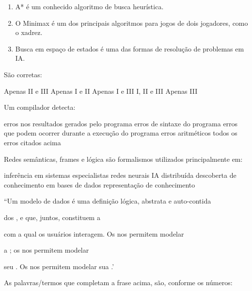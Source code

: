 \documentclass[12pt, addpoints]{exam}
\begin{document}
\begin{questions}
\begin{enumerate}[label=\Roman*.]
    \item A* é um conhecido algoritmo de busca heurística.

    \item O Minimax é um dos principais algoritmos para jogos de dois jogadores, como o xadrez.

    \item Busca em espaço de estados é uma das formas de resolução de problemas em IA.

\end{enumerate}

São corretas:
\begin{choices}
\choice Apenas II e III
\choice Apenas I e II
\choice Apenas I e III
\choice I, II e III
\choice Apenas III
\end{choices}

\question

Um compilador detecta:
\begin{choices}
\choice erros nos resultados gerados pelo programa
\choice erros de sintaxe do programa 
\choice erros que podem ocorrer durante a execução do programa
\choice erros aritméticos
\choice todos os erros citados acima
\end{choices}

\question

Redes semânticas, frames e lógica são formalismos utilizados principalmente em: 
\begin{choices}
\choice inferência em sistemas especialistas
\choice redes neurais
\choice IA distribuída
\choice descoberta de conhecimento em bases de dados
\choice representação de conhecimento
\end{choices}

\question

``Um modelo de dados é uma definição lógica, abstrata e auto-contida

dos ,  e  que, juntos, constituem a 

com a qual os usuários interagem. Os  nos permitem modelar

a ; os  nos permitem modelar

seu . Os  nos permitem modelar sua .'



As palavras/termos que completam a frase acima, são, conforme os números:



\end{questions}
\end{document}
